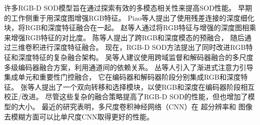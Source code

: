 %
%
%
%
%
%




许多RGB-D SOD模型旨在通过探索有效的多模态相关性来提高SOD性能。
早期的工作侧重于用深度图增强RGB特征。
Piao等人\cite{piao2019depth}提出了使用残差连接的深度细化块，将RGB和深度特征融合在一起。
赵等人\cite{zhao2019contrast}通过将RGB特征与增强的深度图相乘来增强RGB特征的对比度。
陈等人\cite{chen2021rgb}提出了跨RGB和深度模态的预融合，
随后通过三维卷积进行深度特征融合。
现在，RGB-D SOD方法提出了同时改进RGB特征和深度特征的复杂融合架构。
吴等人\cite{wu2023hidanet}建议使用跨域监督和解码器融合的多尺度多级编码器融合方案，利用通道间的依赖关系。
丛等人\cite{cong2022cir}引入了渐进式注意力引导集成单元和重要性门控融合，
它在编码器和解码器阶段分别集成RGB和深度特征。
张等人\cite{zhang2021bts}提出了一个双向转移和选择模块，以使RGB和深度在编码器阶段相互校正/改进。
尽管这些复杂的融合策略提高了RGB-D SOD的性能，但也增加了模型的大小。
最近的研究表明，多尺度卷积神经网络（CNN）在
超分辨率\cite{lai2017deep,dong2016accelerating}和
图像去模糊\cite{cho2021rethinking,kim2022mssnet}方面可以比单尺度CNN取得更好的性能。




